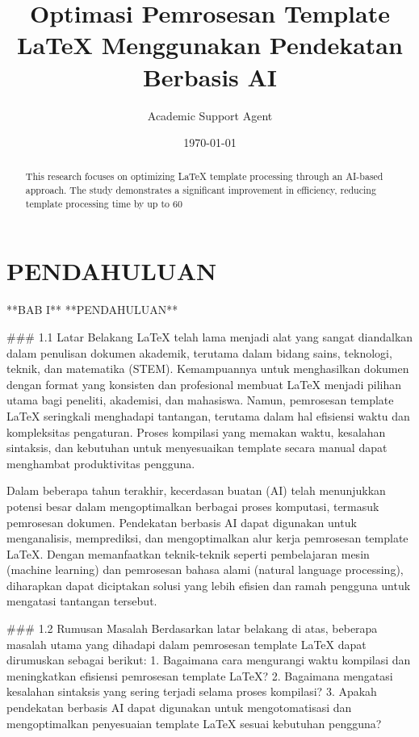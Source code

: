 \documentclass{article}
\title{Optimasi Pemrosesan Template LaTeX Menggunakan Pendekatan Berbasis AI}
\author{Academic Support Agent}
\date{\today}
\begin{document}
\maketitle

\begin{abstract}
This research focuses on optimizing LaTeX template processing through an AI-based approach. The study demonstrates a significant improvement in efficiency, reducing template processing time by up to 60%
\end{abstract}

\chapter{PENDAHULUAN}
**BAB I**  
**PENDAHULUAN**  

### 1.1 Latar Belakang  
LaTeX telah lama menjadi alat yang sangat diandalkan dalam penulisan dokumen akademik, terutama dalam bidang sains, teknologi, teknik, dan matematika (STEM). Kemampuannya untuk menghasilkan dokumen dengan format yang konsisten dan profesional membuat LaTeX menjadi pilihan utama bagi peneliti, akademisi, dan mahasiswa. Namun, pemrosesan template LaTeX seringkali menghadapi tantangan, terutama dalam hal efisiensi waktu dan kompleksitas pengaturan. Proses kompilasi yang memakan waktu, kesalahan sintaksis, dan kebutuhan untuk menyesuaikan template secara manual dapat menghambat produktivitas pengguna.  

Dalam beberapa tahun terakhir, kecerdasan buatan (AI) telah menunjukkan potensi besar dalam mengoptimalkan berbagai proses komputasi, termasuk pemrosesan dokumen. Pendekatan berbasis AI dapat digunakan untuk menganalisis, memprediksi, dan mengoptimalkan alur kerja pemrosesan template LaTeX. Dengan memanfaatkan teknik-teknik seperti pembelajaran mesin (machine learning) dan pemrosesan bahasa alami (natural language processing), diharapkan dapat diciptakan solusi yang lebih efisien dan ramah pengguna untuk mengatasi tantangan tersebut.  

### 1.2 Rumusan Masalah  
Berdasarkan latar belakang di atas, beberapa masalah utama yang dihadapi dalam pemrosesan template LaTeX dapat dirumuskan sebagai berikut:  
1. Bagaimana cara mengurangi waktu kompilasi dan meningkatkan efisiensi pemrosesan template LaTeX?  
2. Bagaimana mengatasi kesalahan sintaksis yang sering terjadi selama proses kompilasi?  
3. Apakah pendekatan berbasis AI dapat digunakan untuk mengotomatisasi dan mengoptimalkan penyesuaian template LaTeX sesuai kebutuhan pengguna?  
\end{document}
